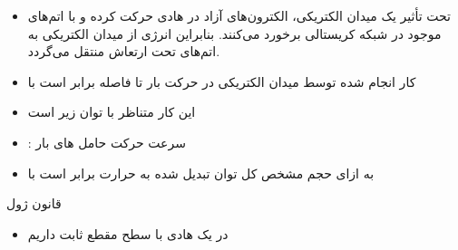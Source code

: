 \begin{ELunit}


\begin{itemize}
\tightlist
\item
  تحت تأثیر یک میدان الکتریکی، الکترون‌های آزاد در هادی حرکت کرده و با اتم‌های موجود در شبکه کریستالی برخورد می‌کنند. بنابراین انرژی از میدان الکتریکی به اتم‌های تحت ارتعاش منتقل می‌گردد.
\item
  کار انجام شده توسط میدان الکتریکی در حرکت بار  تا فاصله \ELim{\Delta\ell} برابر است با
\end{itemize}


\begin{itemize}
\tightlist
\item
  این کار متناظر با توان زیر است
\end{itemize}


\begin{itemize}
\tightlist
\item
  : سرعت حرکت حامل های بار
\end{itemize}


\end{ELunit}

\begin{ELjoin}

\begin{itemize}
\tightlist
\item
  به ازای حجم مشخص  کل توان تبدیل شده به حرارت برابر است با
\end{itemize}

\begin{ELimportant}{قانون ژول}


\end{ELimportant}

\end{ELjoin}

\begin{ELjoin}

\begin{itemize}
\tightlist
\item
  در یک هادی با سطح مقطع ثابت داریم
\end{itemize}


\begin{ELimportant}{}


\end{ELimportant}

\end{ELjoin}

